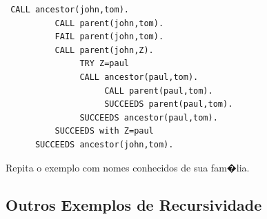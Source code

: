 \documentclass[final,a4paper]{article}
\begin{document}
\begin{lstlisting}
 CALL ancestor(john,tom).
          CALL parent(john,tom).
          FAIL parent(john,tom).
          CALL parent(john,Z).
               TRY Z=paul
               CALL ancestor(paul,tom).
                    CALL parent(paul,tom).
                    SUCCEEDS parent(paul,tom).
               SUCCEEDS ancestor(paul,tom).
          SUCCEEDS with Z=paul
      SUCCEEDS ancestor(john,tom).
\end{lstlisting}

Repita o exemplo com nomes conhecidos de sua fam�lia.

\newpage
\subsection{Outros Exemplos de Recursividade}
\end{document}
